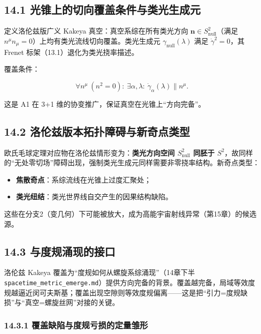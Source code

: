 \subsection{14.1
光锥上的切向覆盖条件与类光生成元}\label{ux5149ux9525ux4e0aux7684ux5207ux5411ux8986ux76d6ux6761ux4ef6ux4e0eux7c7bux5149ux751fux6210ux5143}

定义洛伦兹版广义 Kakeya 真空：真空系综在所有类光方向
\(\mathbf{n}\in S^2_{\text{null}}\)（满足
\(n^\mu n_\mu=0\)）上均有类光流线切向覆盖。类光生成元
\(\gamma_{\text{null}}(\lambda)\) 满足 \(\dot\gamma^2=0\)，其 Frenet
标架（13.1）退化为类光挠率描述。

覆盖条件：

\[
\forall n^\mu\ (n^2=0):\ \exists\alpha,\lambda:\ \dot\gamma_\alpha(\lambda)\parallel n^\mu.
\]

这是 A1 在 3+1 维的协变推广，保证真空在光锥上``方向完备''。

\subsection{14.2
洛伦兹版本拓扑障碍与新奇点类型}\label{ux6d1bux4f26ux5179ux7248ux672cux62d3ux6251ux969cux788dux4e0eux65b0ux5947ux70b9ux7c7bux578b}

欧氏毛球定理对应物在洛伦兹情形变为：\textbf{类光方向空间
\(S^2_{\text{null}}\) 同胚于
\(S^2\)}，故同样的``无处零切场''障碍出现，强制类光生成元同样需要非零挠率结构。新奇点类型：

\begin{itemize}
\tightlist
\item
  \textbf{焦散奇点}：系综流线在光锥上过度汇聚处；
\item
  \textbf{类光纽结}：类光世界线自交产生的因果结构缺陷。
\end{itemize}

这些在分支2（变几何）下可能被放大，成为高能宇宙射线异常（第15章）的候选源。

\subsection{14.3
与度规涌现的接口}\label{ux4e0eux5ea6ux89c4ux6d8cux73b0ux7684ux63a5ux53e3}

洛伦兹 Kakeya 覆盖为``度规如何从螺旋系综涌现''（14章下半
\texttt{spacetime\_metric\_emerge.md}）提供方向完备的背景。覆盖越完备，局域等效度规越逼近闵可夫斯基；覆盖出现空隙则等效度规偏离------这是把``引力=度规缺损''与``真空=螺旋丝网''对接的关键。

\subsubsection{14.3.1
覆盖缺陷与度规亏损的定量雏形}\label{ux8986ux76d6ux7f3aux9677ux4e0eux5ea6ux89c4ux4e8fux635fux7684ux5b9aux91cfux96cfux5f62}


